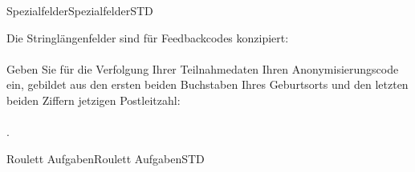 \begin{MXContent}{Spezialfelder}{Spezialfelder}{STD}
\begin{MExample}
Die Stringlängenfelder sind für Feedbackcodes konzipiert:
\ \\ \ \\
Geben Sie für die Verfolgung Ihrer Teilnahmedaten Ihren Anonymisierungscode ein, gebildet aus den ersten beiden Buchstaben Ihres Geburtsorts
und den letzten beiden Ziffern jetzigen Postleitzahl:
\ \\ \ \\
.
\end{MExample}

\end{MXContent}

\begin{MXContent}{Roulett Aufgaben}{Roulett Aufgaben}{STD}


\end{MXContent}

